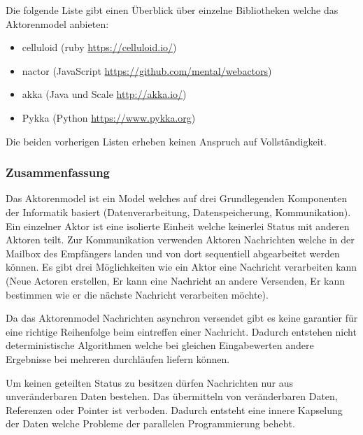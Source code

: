 Die folgende Liste gibt einen Überblick über einzelne Bibliotheken welche das Aktorenmodel anbieten:

\begin{itemize}
  \item celluloid (ruby \url{https://celluloid.io/})
  \item nactor (JavaScript \url{https://github.com/mental/webactors})
  \item akka (Java und Scale \url{http://akka.io/})
  \item Pykka (Python \url{https://www.pykka.org})
\end{itemize}

Die beiden vorherigen Listen erheben keinen Anspruch auf Vollständigkeit. 


\subsubsection{Zusammenfassung}
Das Aktorenmodel ist ein Model welches auf drei Grundlegenden Komponenten der Informatik basiert (Datenverarbeitung, Datenspeicherung, Kommunikation). Ein einzelner Aktor ist eine isolierte Einheit welche keinerlei Status mit anderen Aktoren teilt. Zur Kommunikation verwenden Aktoren Nachrichten welche in der Mailbox des Empfängers landen und von dort sequentiell abgearbeitet werden können. Es gibt drei Möglichkeiten wie ein Aktor eine Nachricht verarbeiten kann (Neue Actoren erstellen, Er kann eine Nachricht an andere Versenden, Er kann bestimmen wie er die nächste Nachricht verarbeiten möchte).

Da das Aktorenmodel Nachrichten asynchron versendet gibt es keine garantier für eine richtige Reihenfolge beim eintreffen einer Nachricht. Dadurch entstehen nicht deterministische Algorithmen welche bei gleichen Eingabewerten andere Ergebnisse bei mehreren durchläufen liefern können. 

Um keinen geteilten Status zu besitzen dürfen Nachrichten nur aus unveränderbaren Daten bestehen. Das übermitteln von veränderbaren Daten, Referenzen oder Pointer ist verboden. Dadurch entsteht eine innere Kapselung der Daten welche Probleme der parallelen Programmierung behebt. 